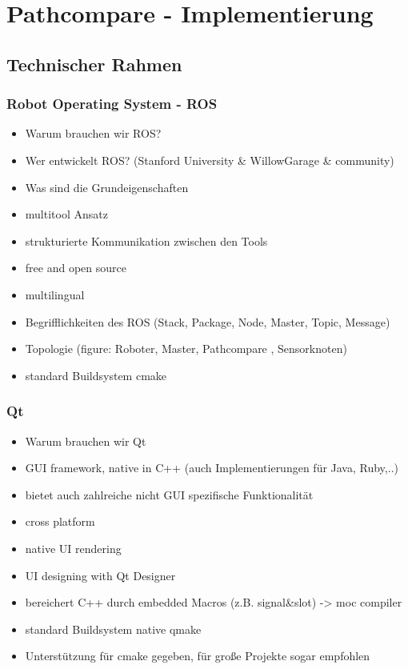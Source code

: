 \chapter{Pathcompare - Implementierung}
\label{sec:implementierung}
\section{Technischer Rahmen}

\subsection{Robot Operating System - ROS}
\begin{itemize}
  \item Warum brauchen wir ROS?
  \item Wer entwickelt ROS? (Stanford University \& WillowGarage \& community)
  \item Was sind die Grundeigenschaften 
  \item multitool Ansatz
  \item strukturierte Kommunikation zwischen den Tools
  \item free and open source
  \item multilingual 
  \item Begrifflichkeiten des ROS (Stack, Package, Node, Master, Topic, Message)
  \item Topologie (figure: Roboter, Master, Pathcompare , Sensorknoten)
  \item standard Buildsystem cmake
\end{itemize}

\subsection{Qt}
\begin{itemize}
  \item Warum brauchen wir Qt
  \item GUI framework, native in C++ (auch Implementierungen für Java, Ruby,..)
  \item bietet auch zahlreiche nicht GUI spezifische Funktionalität
  \item cross platform
  \item native UI rendering
  \item UI designing with Qt Designer
  \item bereichert C++ durch embedded Macros (z.B. signal\&slot) -> moc compiler
  \item standard Buildsystem native qmake 
  \item Unterstützung für cmake gegeben, für große Projekte sogar empfohlen
\end{itemize}


